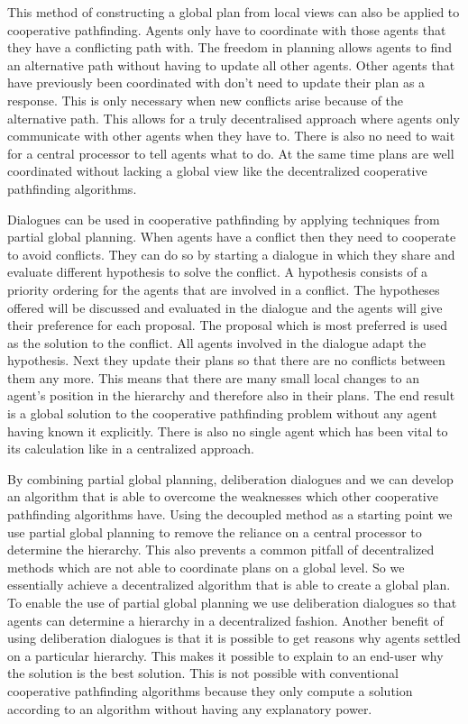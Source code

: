 This method of constructing a global plan from local views can also be applied
to cooperative pathfinding. Agents only have to coordinate with those agents
that they have a conflicting path with. The freedom in planning allows agents
to find an alternative path without having to update all other agents. Other
agents that have previously been coordinated with don't need to update their
plan as a response. This is only necessary when new conflicts arise because of
the alternative path. This allows for a truly decentralised approach where
agents  only communicate with other agents when they have to. There is also no
need to wait for a central processor to tell agents what to do. At the same
time plans are well coordinated without lacking a global view like the
decentralized cooperative pathfinding algorithms.

Dialogues can be used in cooperative pathfinding by applying techniques from
partial global planning. When agents have a conflict then they need to
cooperate to avoid conflicts. They can do so by starting a dialogue in which
they share and evaluate different hypothesis to solve the conflict. A
hypothesis consists of a priority ordering for the agents that are involved in
a conflict. The hypotheses offered will be discussed and evaluated in the
dialogue and the agents will give their preference for each proposal. The
proposal which is most preferred is used as the solution to the conflict. All
agents involved in the dialogue adapt the hypothesis. Next they update their
plans so that there are no conflicts between them any more. This means that
there are many small local changes to an agent's position in the hierarchy and
therefore also in their plans. The end result is a global solution to the
cooperative pathfinding problem without any agent having known it explicitly.
There is also no single agent which has been vital to its calculation like in a
centralized approach.

By combining partial global planning, deliberation dialogues and we can develop
an algorithm that is able to overcome the weaknesses which other cooperative
pathfinding algorithms have. Using the decoupled method as a starting point we
use partial global planning to remove the reliance on a central processor to
determine the hierarchy. This also prevents a common pitfall of decentralized
methods which are not able to coordinate plans on a global level. So we
essentially achieve a decentralized algorithm that is able to create a global
plan. To enable the use of partial global planning we use deliberation
dialogues so that agents can determine a hierarchy in a decentralized fashion.
Another benefit of using deliberation dialogues is that it is possible to get
reasons why agents settled on a particular hierarchy. This makes it possible to
explain to an end-user why the solution is the best solution. This is not
possible with conventional cooperative pathfinding algorithms because they only
compute a solution according to an algorithm without having any explanatory
power.

